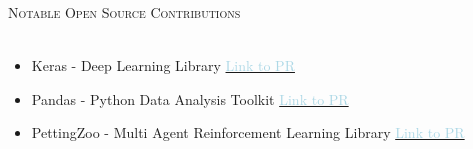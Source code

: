 \documentclass[a4paper]{article}
\newcommand{\lineunder} {
    \vspace*{-8pt} \\
    \hspace*{-18pt} \hrulefill \\
}
\newcommand{\header} [1] {
    {\hspace*{-18pt}\vspace*{6pt} \textsc{#1}}
    \vspace*{-6pt} \lineunder
}
\begin{document}
\vspace{1mm}
\header{Notable Open Source Contributions}
\vspace{-3mm}
\begin{itemize} \itemsep 0.5pt
	\item \begin{normalsize} Keras - Deep Learning Library \hfill \href{https://github.com/keras-team/keras/pull/19829}{\textcolor{lightblue}{Link to PR}} \end{normalsize}
	\vspace{-2mm}
    \item \begin{normalsize} Pandas - Python Data Analysis Toolkit \hfill \href{https://github.com/pandas-dev/pandas/pull/58982}{\textcolor{lightblue}{Link to PR}} \end{normalsize}
	\vspace{-2mm}
    \item \begin{normalsize} PettingZoo - Multi Agent Reinforcement Learning Library \hfill \href{https://github.com/Farama-Foundation/PettingZoo/pull/1213}{\textcolor{lightblue}{Link to PR}} \end{normalsize}
	\vspace{-2mm}
\end{itemize}
\end{document}

